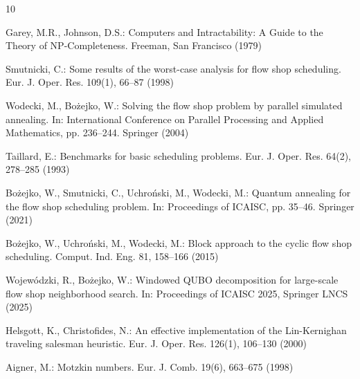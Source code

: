\documentclass[runningheads]{llncs}
\begin{document}
\begin{thebibliography}{10}

Garey, M.R., Johnson, D.S.: Computers and Intractability: A Guide to the Theory of NP-Completeness. Freeman, San Francisco (1979)

Smutnicki, C.: Some results of the worst-case analysis for flow shop scheduling. Eur. J. Oper. Res. 109(1), 66--87 (1998)

Wodecki, M., Bożejko, W.: Solving the flow shop problem by parallel simulated annealing. In: International Conference on Parallel Processing and Applied Mathematics, pp. 236--244. Springer (2004)

Taillard, E.: Benchmarks for basic scheduling problems. Eur. J. Oper. Res. 64(2), 278--285 (1993)

Bożejko, W., Smutnicki, C., Uchroński, M., Wodecki, M.: Quantum annealing for the flow shop scheduling problem. In: Proceedings of ICAISC, pp. 35--46. Springer (2021)

Bożejko, W., Uchroński, M., Wodecki, M.: Block approach to the cyclic flow shop scheduling. Comput. Ind. Eng. 81, 158--166 (2015)

Wojewódzki, R., Bożejko, W.: Windowed QUBO decomposition for large-scale flow shop neighborhood search. In: Proceedings of ICAISC 2025, Springer LNCS (2025)

Helsgott, K., Christofides, N.: An effective implementation of the Lin-Kernighan traveling salesman heuristic. Eur. J. Oper. Res. 126(1), 106--130 (2000)

Aigner, M.: Motzkin numbers. Eur. J. Comb. 19(6), 663--675 (1998)

\end{thebibliography}
\end{document}
